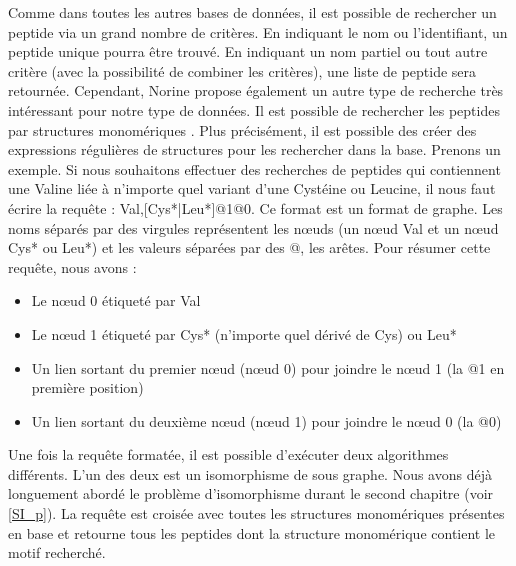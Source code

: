 Comme dans toutes les autres bases de données, il est possible de rechercher un peptide via un grand nombre de critères.
En indiquant le nom ou l'identifiant, un peptide unique pourra être trouvé.
En indiquant un nom partiel ou tout autre critère (avec la possibilité de combiner les critères), une liste de peptide sera retournée.
Cependant, Norine propose également un autre type de recherche très intéressant pour notre type de données.
Il est possible de rechercher les peptides par structures monomériques \cite{caboche_structural_2009}.
Plus précisément, il est possible des créer des expressions régulières de structures pour les rechercher dans la base.
Prenons un exemple.
Si nous souhaitons effectuer des recherches de peptides qui contiennent une Valine liée à n'importe quel variant d'une Cystéine ou Leucine, il nous faut écrire la requête : Val,[Cys*|Leu*]@1@0.
Ce format est un format de graphe.
Les noms séparés par des virgules représentent les n\oe{}uds (un n\oe{}ud Val et un n\oe{}ud Cys* ou Leu*) et les valeurs séparées par des @, les arêtes.
Pour résumer cette requête, nous avons :
\begin{itemize}
 \item Le n\oe{}ud 0 étiqueté par Val
 \item Le n\oe{}ud 1 étiqueté par Cys* (n'importe quel dérivé de Cys) ou Leu*
 \item Un lien sortant du premier n\oe{}ud (n\oe{}ud 0) pour joindre le n\oe{}ud 1 (la @1 en première position)
 \item Un lien sortant du deuxième n\oe{}ud (n\oe{}ud 1) pour joindre le n\oe{}ud 0 (la @0)
\end{itemize}

Une fois la requête formatée, il est possible d'exécuter deux algorithmes différents.
L'un des deux est un isomorphisme de sous graphe.
Nous avons déjà longuement abordé le problème d'isomorphisme durant le second chapitre (voir \ref{SI_p}).
La requête est croisée avec toutes les structures monomériques présentes en base et retourne tous les peptides dont la structure monomérique contient le motif recherché.

